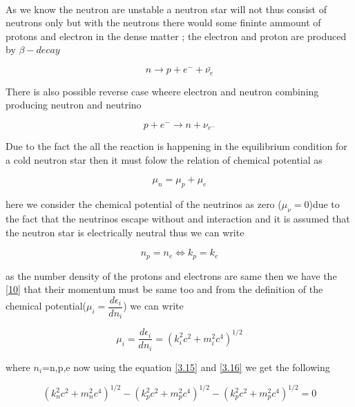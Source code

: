 \documentclass{report}
\begin{document}
\paragraph{ }
As we know the neutron are unstable a neutron star will not thus consist of neutrons only but with the neutrons there would some fininte ammount of protons and electron in the dense matter ; the electron and proton are produced by $\beta-decay$
\begin{center}
\begin{equation}
n \rightarrow p+e^- + \bar{\nu_e}
\label{3.13}
\end{equation}
\end{center}
There is also possible reverse case wheere electron and neutron combining producing neutron and neutrino
\begin{center}
\begin{equation}
 p +e^- \rightarrow n+\nu_{e^{-}}
\label{3.14}
\end{equation}
\end{center}
Due to the fact the all the reaction is happening in the equilibrium condition for a cold neutron star then it must folow the relation of chemical potential  as 
\begin{center}
\begin{equation}
\mu_n = \mu_p+\mu_e
\label{3.15}
\end{equation}
\end{center} 
here we consider the chemical potential of the neutrinos as zero ($\mu_{\nu} =0 $)due to the fact that the neutrinos escape without and interaction and it is assumed that the neutron star is electrically neutral thus we can write
\begin{center}
\begin{equation}
n_p = n_e \Leftrightarrow k_p = k_e
\label{3.16}
\end{equation}
\end{center}
as the number density of the protons and electrons are same then we have the \ref{10} that their momentum must be same too and from the definition of the chemical potential($\mu_i = \dfrac{d\epsilon_i}{dn_i}$) we can write 
\begin{center}
\begin{equation}
\mu_i = \dfrac{d\epsilon_i}{dn_i}=\left(k_i^2 c^2+m_i^2c^4 \right)^{1/2}
\label{3.17}
\end{equation}
\end{center}
where $n_i$=n,p,e now using the equation \ref{3.15} and \ref{3.16} we get the following 
\begin{center}
\begin{equation}
\left(k_n^2 c^2+m_n^2c^4 \right)^{1/2}-\left(k_p^2 c^2+m_p^2c^4 \right)^{1/2}-\left(k_p^2 c^2+m_p^2c^4 \right)^{1/2} = 0
\label{3.18}
\end{equation}
\end{center}
\end{document}

